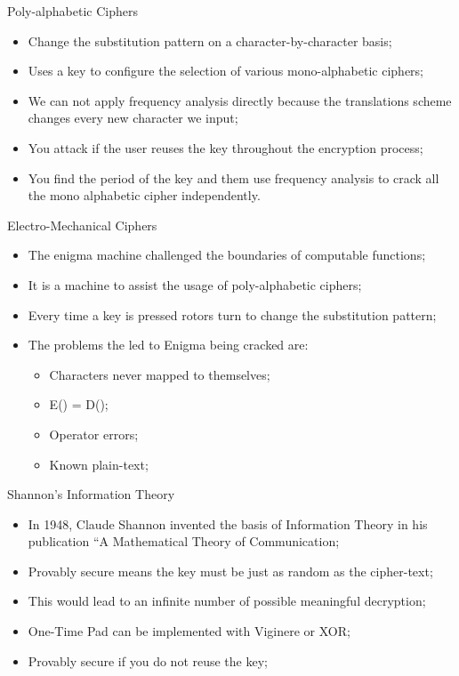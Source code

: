 \documentclass[12pt]{beamer}
\begin{document}
\begin{frame}{Poly-alphabetic  Ciphers}
\begin{itemize}
\item Change the substitution pattern on a character-by-character basis;\pause
\item Uses a key to configure the selection of various mono-alphabetic ciphers;\pause
\item We can not apply frequency analysis directly because the translations scheme changes every new character we input;\pause
\item You attack if the user reuses the key throughout the encryption process;\pause
\item You find the period of the key and them use frequency analysis to crack all the mono alphabetic cipher independently.
\end{itemize}
\end{frame}

\begin{frame}{Electro-Mechanical Ciphers}
\begin{itemize}
\item The enigma machine challenged the boundaries of computable functions;\pause
\item It is a machine to assist the usage of poly-alphabetic ciphers;\pause
\item Every time a key is pressed rotors turn to change the substitution pattern;\pause
\item The problems the led to Enigma being cracked are:\pause
\begin{itemize}
\item Characters never mapped to themselves;\pause
\item E() = D();\pause
\item Operator errors;\pause
\item Known plain-text;\pause
\end{itemize}
\end{itemize}
\end{frame}


\begin{frame}{Shannon's  Information Theory}
\begin{itemize}
\item In 1948, Claude Shannon invented the basis of Information Theory in his publication ``A Mathematical Theory of Communication;\pause
\item Provably secure means the key must be just as random as the cipher-text;\pause
\item This would lead to an infinite number of possible meaningful decryption;\pause
\item One-Time Pad can be implemented with Viginere or XOR;\pause
\item Provably secure if you do not reuse the key;
\end{itemize}
\end{frame}
\end{document}
